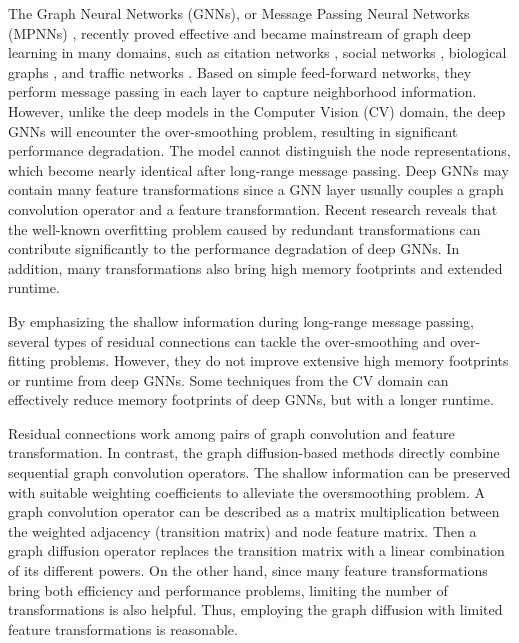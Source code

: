 \documentclass{article}
\begin{document}
The Graph Neural Networks (GNNs), or Message Passing Neural Networks (MPNNs) \cite{gilmer2017neural}, recently proved effective and became mainstream of graph deep learning in many domains, such as citation networks \cite{kipf2016semi, hamilton2017inductive, kipf2016variational}, social networks \cite{hamilton2017inductive, chen2018fastgcn}, biological graphs \cite{fout2017protein}, and traffic networks \cite{yu2021deep, li2021traffic, yin2021multi}. Based on simple feed-forward networks, they perform message passing in each layer to capture neighborhood information. However, unlike the deep models in the Computer Vision (CV) domain, the deep GNNs \cite{li2018deeper, wang2019improving} will encounter the over-smoothing problem, resulting in significant performance degradation. The model cannot distinguish the node representations, which become nearly identical after long-range message passing. Deep GNNs may contain many feature transformations since a GNN layer usually couples a graph convolution operator and a feature transformation. Recent research \cite{liu2020towards} reveals that the well-known overfitting problem caused by redundant transformations can contribute significantly to the performance degradation of deep GNNs. In addition, many transformations also bring high memory footprints and extended runtime.



By emphasizing the shallow information during long-range message passing, several types of residual connections \cite{li2018deeper, li2019deepgcns, li2020deepergcn, chen2020simple,li2021training} can tackle the over-smoothing and over-fitting problems. However, they do not improve extensive high memory footprints or runtime from deep GNNs. Some techniques \cite{li2021training} from the CV domain can effectively reduce memory footprints of deep GNNs, but with a longer runtime.

Residual connections work among pairs of graph convolution and feature transformation. In contrast, the graph diffusion-based methods directly combine sequential graph convolution operators. The shallow information can be preserved with suitable weighting coefficients to alleviate the oversmoothing problem. A graph convolution operator can be described as a matrix multiplication between the weighted adjacency (transition matrix) and node feature matrix. Then a graph diffusion operator replaces the transition matrix with a linear combination of its different powers.
On the other hand, since many feature transformations bring both efficiency and performance problems, limiting the number of transformations is also helpful. Thus, employing the graph diffusion with limited feature transformations is reasonable. 
\end{document}
